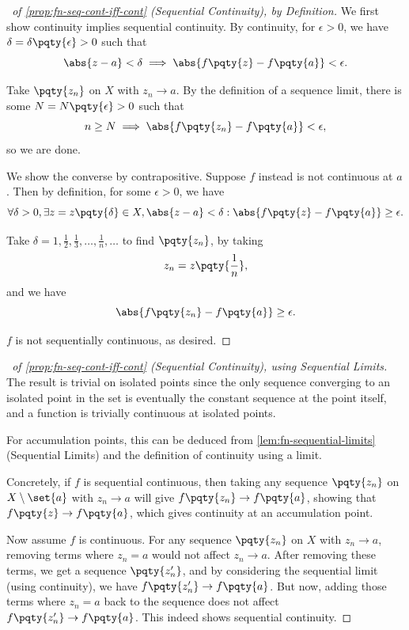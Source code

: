 \begin{proof}[\proofname\ of \autoref{prop:fn-seq-cont-iff-cont} (Sequential Continuity), by Definition]
    We first show continuity implies sequential continuity. By continuity, for \(\epsilon > 0\), we have \(\delta = \delta\pqty{\epsilon} > 0\) such that
    \[
        \abs{z - a} < \delta \implies \abs{f\pqty{z} - f\pqty{a}} < \epsilon.
    \]

    Take \(\pqty{z_n}\) on \(X\) with \(z_n \to a\). By the definition of a sequence limit, there is some \(N = N\pqty{\epsilon} > 0\) such that
    \[
        n \geq N \implies \abs{f\pqty{z_n} - f\pqty{a}} < \epsilon,
    \]
    so we are done.

    We show the converse by contrapositive. Suppose \(f\) instead is not continuous at \(a\). Then by definition, for some \(\epsilon > 0\), we have
    \[
        \forall \delta > 0, \exists z = z\pqty{\delta} \in X, \abs{z - a} < \delta: \abs{f\pqty{z} - f\pqty{a}} \geq \epsilon.
    \]

    Take \(\delta = 1, \frac{1}{2}, \frac{1}{3}, \ldots, \frac{1}{n}, \ldots\) to find \(\pqty{z_n}\), by taking
    \[
        z_n = z \pqty{\frac{1}{n}},
    \]
    and we have
    \[
        \abs{f\pqty{z_n} - f\pqty{a}} \geq \epsilon.
    \]

    \(f\) is not sequentially continuous, as desired.
\end{proof}

\begin{proof}[\proofname\ of \autoref{prop:fn-seq-cont-iff-cont} (Sequential Continuity), using Sequential Limits]
    The result is trivial on isolated points since the only sequence converging to an isolated point in the set is eventually the constant sequence at the point itself, and a function is trivially continuous at isolated points.

    For accumulation points, this can be deduced from \autoref{lem:fn-sequential-limits} (Sequential Limits) and the definition of continuity using a limit. 
    
    Concretely, if \(f\) is sequential continuous, then taking any sequence \(\pqty{z_n}\) on \(X \setminus \set{a}\) with \(z_n \to a\) will give \(f\pqty{z_n} \to f\pqty{a}\), showing that \(f\pqty{z} \to f\pqty{a}\), which gives continuity at an accumulation point.

    Now assume \(f\) is continuous. For any sequence \(\pqty{z_n}\) on \(X\) with \(z_n \to a\), removing terms where \(z_n = a\) would not affect \(z_n \to a\). After removing these terms, we get a sequence \(\pqty{z'_n}\), and by considering the sequential limit (using continuity), we have \(f\pqty{z'_n} \to f\pqty{a}\). But now, adding those terms where \(z_n = a\) back to the sequence does not affect \(f\pqty{z'_n} \to f\pqty{a}\). This indeed shows sequential continuity.
\end{proof}

